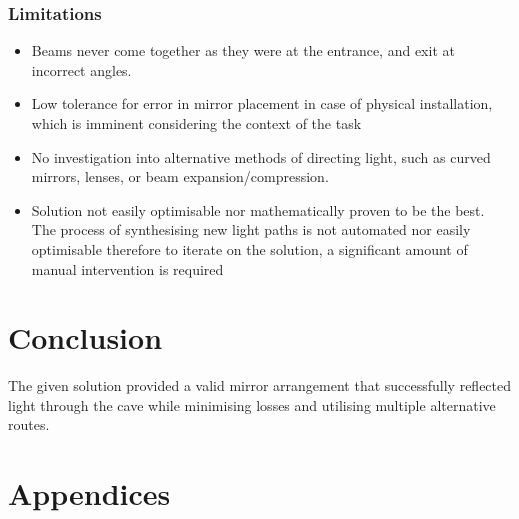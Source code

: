 \documentclass[11pt, letterpaper]{article}
\begin{document}
\subsubsection{Limitations}
\begin{itemize}
\item Beams never come together as they were at the entrance, and exit at incorrect angles. 

\item Low tolerance for error in mirror placement in case of physical installation, which is imminent considering the context of the task

\item No investigation into alternative methods of directing light, such as curved mirrors, lenses, or beam expansion/compression.

\item Solution not easily optimisable nor mathematically proven to be the best. The process of synthesising new light paths is not automated nor easily optimisable therefore to iterate on the solution, a significant amount of manual intervention is required

\end{itemize}
\section{Conclusion}
The given solution provided a valid mirror arrangement that successfully reflected light through the cave while minimising losses and utilising multiple alternative routes. 

 \section{Appendices}
 
\end{document}
